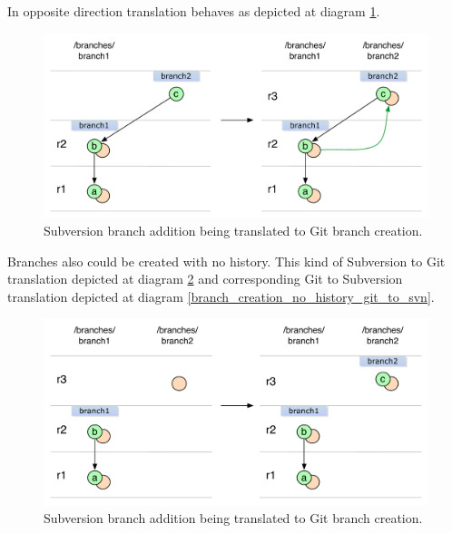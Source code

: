 In opposite direction translation behaves as depicted at diagram \ref{branch_creation_git_to_svn}.
\begin{figure}[!h]
\centering
\renewcommand{\figurename}{Diagram}
\includegraphics[width=\linewidth]{img/diagrams/branch_creation_git_to_svn.pdf}
\caption{Subversion branch addition being translated to Git branch creation.}
\label{branch_creation_git_to_svn}
\end{figure}

Branches also could be created with no history. This kind of Subversion to Git translation depicted at diagram \ref{branch_creation_no_history_svn_to_git} and corresponding Git to Subversion translation depicted at diagram \ref{branch_creation_no_history_git_to_svn}.

\begin{figure}[!h]
\centering
\renewcommand{\figurename}{Diagram}
\includegraphics[width=\linewidth]{img/diagrams/branch_creation_no_history_svn_to_git.pdf}
\caption{Subversion branch addition being translated to Git branch creation.}
\label{branch_creation_no_history_svn_to_git}
\end{figure}

